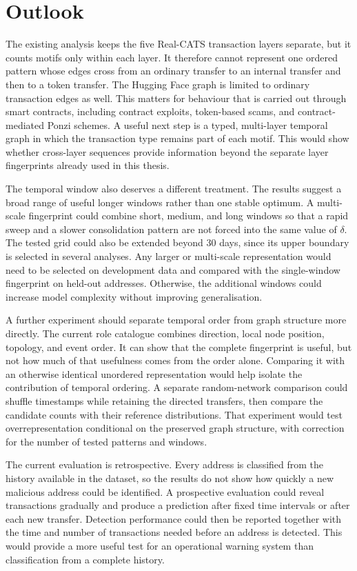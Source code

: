 \documentclass{thesisclass}
\begin{document}
\section{Outlook}

The existing analysis keeps the five Real-CATS transaction layers separate, but
it counts motifs only within each layer. It therefore cannot represent one
ordered pattern whose edges cross from an ordinary transfer to an internal
transfer and then to a token transfer. The Hugging Face graph is limited to
ordinary transaction edges as well. This matters for behaviour that is carried
out through smart contracts, including contract exploits, token-based scams,
and contract-mediated Ponzi schemes. A useful next step is a typed, multi-layer
temporal graph in which the transaction type remains part of each motif. This
would show whether cross-layer sequences provide information beyond the
separate layer fingerprints already used in this thesis.

The temporal window also deserves a different treatment. The results suggest a
broad range of useful longer windows rather than one stable optimum. A
multi-scale fingerprint could combine short, medium, and long windows so that a
rapid sweep and a slower consolidation pattern are not forced into the same
value of $\delta$. The tested grid could also be extended beyond 30 days, since
its upper boundary is selected in several analyses. Any larger or multi-scale
representation would need to be selected on development data and compared with
the single-window fingerprint on held-out addresses. Otherwise, the additional
windows could increase model complexity without improving generalisation.

A further experiment should separate temporal order from graph structure more
directly. The current role catalogue combines direction, local node position,
topology, and event order. It can show that the complete fingerprint is useful,
but not how much of that usefulness comes from the order alone. Comparing it
with an otherwise identical unordered representation would help isolate the
contribution of temporal ordering. A separate random-network comparison could
shuffle timestamps while retaining the directed transfers, then compare the
candidate counts with their reference distributions. That experiment would test
overrepresentation conditional on the preserved graph structure, with correction
for the number of tested patterns and windows.

The current evaluation is retrospective. Every address is classified from the
history available in the dataset, so the results do not show how quickly a new
malicious address could be identified. A prospective evaluation could reveal
transactions gradually and produce a prediction after fixed time intervals or
after each new transfer. Detection performance could then be reported together
with the time and number of transactions needed before an address is detected.
This would provide a more useful test for an operational warning system than
classification from a complete history.
\end{document}
